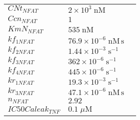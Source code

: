 \documentclass[a4paper,10.0pt]{article}
\begin{document}
{\begin{longtabu}{| l l l |}
  $CNt_{NFAT}$\hspace{0.5cm} & $2\!\times\!10 ^{3}\;\mathrm{nM}$\hspace{0.5cm} & \hspace{0.5cm}\\
  $Ccn_{NFAT}$\hspace{0.5cm} & $1$\hspace{0.5cm} & \hspace{0.5cm}\\
  $KmN_{NFAT}$\hspace{0.5cm} & $535\;\mathrm{nM}$\hspace{0.5cm} & \hspace{0.5cm}\\
  $kf_{1 NFAT}$\hspace{0.5cm} & $76.9\!\times\!10 ^{-6}\;\mathrm{nM}\,\mathrm{s}$\hspace{0.5cm} & \hspace{0.5cm}\\
  $kf_{2 NFAT}$\hspace{0.5cm} & $1.44\!\times\!10 ^{-3}\;\mathrm{s}^{-1}$\hspace{0.5cm} & \hspace{0.5cm}\\
  $kf_{3 NFAT}$\hspace{0.5cm} & $362\!\times\!10 ^{-6}\;\mathrm{s}^{-1}$\hspace{0.5cm} & \hspace{0.5cm}\\
  $kf_{4 NFAT}$\hspace{0.5cm} & $445\!\times\!10 ^{-6}\;\mathrm{s}^{-1}$\hspace{0.5cm} & \hspace{0.5cm}\\
  $kr_{1 NFAT}$\hspace{0.5cm} & $19.3\!\times\!10 ^{-3}\;\mathrm{s}^{-1}$\hspace{0.5cm} & \hspace{0.5cm}\\
  $kr_{3 NFAT}$\hspace{0.5cm} & $47.1\!\times\!10 ^{-6}\;\mathrm{nM}\,\mathrm{s}$\hspace{0.5cm} & \hspace{0.5cm}\\
  $n_{NFAT}$\hspace{0.5cm} & $2.92$\hspace{0.5cm} & \hspace{0.5cm}\\
  $IC50Caleak_{TNF}$\hspace{0.5cm} & $0.1\;\mu\mathrm{M}$\hspace{0.5cm} & \hspace{0.5cm}\\

\end{longtabu}}
\end{document}
